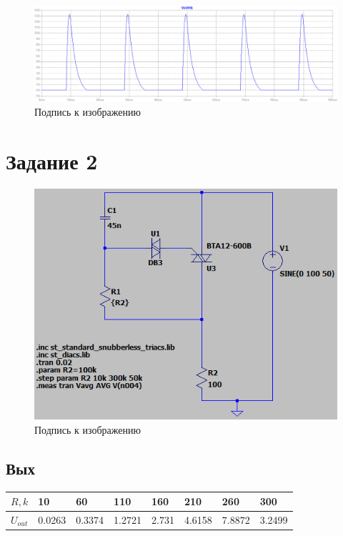 \documentclass[a4paper, 12pt]{article}
\begin{document}
    \begin{figure}[H]
        \centering
        \includegraphics[scale=0.45]{a150_L20m_D.png}
        \captionsetup{skip=0pt}
        \caption{Подпись к изображению}
        \label{fig:a150_L20m_D}
    \end{figure}


    \section{Задание 2}
    \begin{figure}[H]
        \centering
        \includegraphics[scale=0.5]{scheme4.png}
        \captionsetup{skip=0pt}
        \caption{Подпись к изображению}
        \label{fig:scheme4}
    \end{figure}


    \subsection{Вых}
    \begin{center}
        \begin{tabular}{ | m{4em} | m{1.5cm}| m{1.5cm} | m{1.5cm} | m{1.5cm} | m{1.5cm} | m{1.5cm} | m{1.5cm} | } 
        \hline
        $R,k$& 10 & 60 & 110 &160 &210 &260 &300 \\ 
        \hline
        $U_{out}$& 0.0263 & 0.3374 & 1.2721 &2.731 &4.6158 &7.8872 &3.2499\\ 
        \hline
    \end{tabular}
    \end{center}
\end{document}
